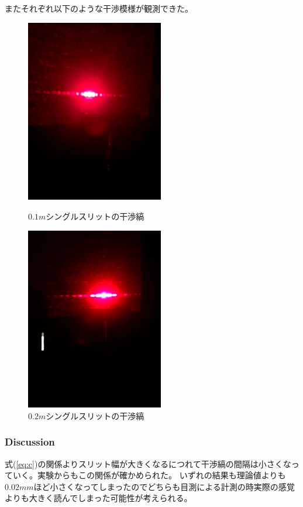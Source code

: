 \documentclass[11pt, a4paper]{jsarticle}
\begin{document}
またそれぞれ以下のような干渉模様が観測できた。\\
\begin{figure}[htbp]
 \begin{minipage}{0.45\hsize}
  \begin{center}
   \includegraphics[width=60mm]{fig9.png}
  \end{center}
  \caption{$0.1m$シングルスリットの干渉縞}
  \label{fig:nine}
 \end{minipage}
 \begin{minipage}{0.45\hsize}
  \begin{center}
   \includegraphics[width=60mm]{fig10.png}
  \end{center}
  \caption{$0.2m$シングルスリットの干渉縞}
  \label{fig:ten}
 \end{minipage}
\end{figure}
\subsubsection{Discussion}
式(\ref{eq:c})の関係よりスリット幅が大きくなるにつれて干渉縞の間隔は小さくなっていく。実験からもこの関係が確かめられた。
いずれの結果も理論値よりも$0.02mm$ほど小さくなってしまったのでどちらも目測による計測の時実際の感覚よりも大きく読んでしまった可能性が考えられる。
\end{document}
